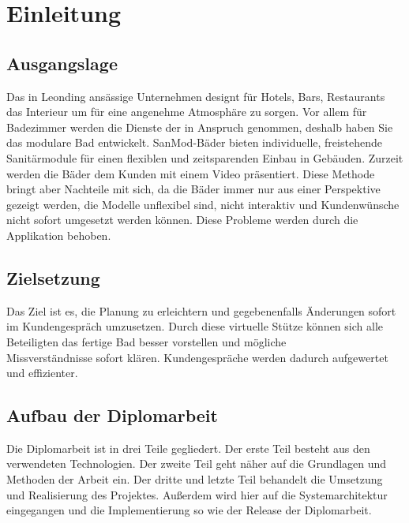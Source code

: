 \chapter{Einleitung}
\section{Ausgangslage}
Das in Leonding ansässige Unternehmen {\projectpartner} designt für Hotels, Bars, Restaurants das Interieur um für eine angenehme Atmosphäre zu sorgen. Vor allem für Badezimmer werden die Dienste der {\projectpartner} in Anspruch genommen, deshalb haben Sie das modulare Bad entwickelt. SanMod-Bäder bieten individuelle, freistehende Sanitärmodule für einen flexiblen und zeitsparenden Einbau in Gebäuden. Zurzeit werden die Bäder dem Kunden mit einem Video präsentiert. Diese Methode bringt aber Nachteile mit sich, da die Bäder immer nur aus einer Perspektive gezeigt werden, die Modelle unflexibel sind, nicht interaktiv und Kundenwünsche nicht sofort umgesetzt werden können. Diese Probleme werden durch die Applikation behoben.

\section{Zielsetzung}
Das Ziel ist es, die Planung zu erleichtern und gegebenenfalls Änderungen sofort im Kundengespräch umzusetzen. Durch diese virtuelle Stütze können sich alle Beteiligten das fertige Bad besser vorstellen und mögliche\\ Missverständnisse sofort klären. Kundengespräche werden dadurch aufgewertet und effizienter.

\section{Aufbau der Diplomarbeit}
Die Diplomarbeit ist in drei Teile gegliedert. 
Der erste Teil besteht aus den verwendeten Technologien.
Der zweite Teil geht näher auf die Grundlagen und Methoden der Arbeit ein.
Der dritte und letzte Teil behandelt die Umsetzung und Realisierung des Projektes.
Außerdem wird hier auf die Systemarchitektur eingegangen und die Implementierung so wie
der Release der Diplomarbeit.